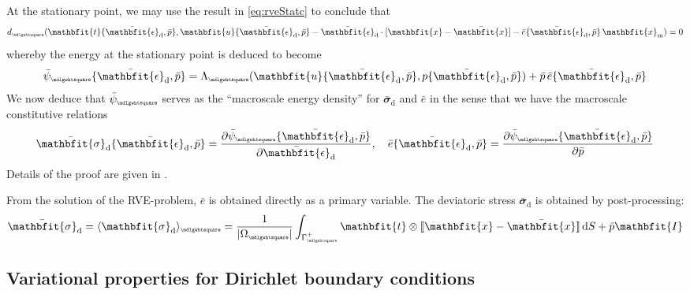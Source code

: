 \documentclass[12pt,a4paper]{article}
\renewcommand{\ta}[1]{\mathbfit{#1}}
\renewcommand{\ts}[1]{\mathbfit{#1}}
\renewcommand{\Box}{\mdlgwhtsquare}
\DeclarePairedDelimiter{\homgen}{\langle}{\rangle_\rve}
\DeclarePairedDelimiter{\jmp}{[\![}{]\!]}
\renewcommand{\dev}{\mathrm{d}}
\newcommand{\volume}{|\Omega_\rve|}
\newcommand{\epspargs}{\{{\bar{\ts\epsilon}}_\dev, \bar{p}\}}
\newcommand{\rve}{
  {\mathchoice
   {\mbox{\scalebox{0.67}{$\Box$}}}
   {\mbox{\scalebox{0.67}{$\Box$}}}
   {\mbox{\scalebox{0.5}{$\Box$}}}
   {\mbox{\scalebox{0.375}{$\Box$}}}
  }
}
\begin{document}
At the stationary point, we may use the result in \cref{eq:rveStatc} to conclude that
\begin{equation}
    d_\rve(\ta{t}\epspargs,\ta{u}\epspargs-\bar{\ts\epsilon}_\dev\cdot[\ta{x}-\bar{\ta{x}}]-\bar{e}\epspargs\,\ta{x}_\mean) = 0
\label{eq86}
\end{equation}
whereby the energy at the stationary point is deduced to become
\begin{equation}
    \bar{\psi}_\rve\epspargs =
    \Lambda_\rve(\ta{u}\epspargs,p\epspargs) + \bar{p}\,\bar{e}\epspargs
\label{eq87}
\end{equation}
We now deduce that $\bar{\psi}_\rve$ serves as the ``macroscale energy density'' for $\bar{\ts\sigma}_\dev$ and $\bar{e}$ in the sense that we have the macroscale constitutive relations
\begin{equation}
    \bar{\ts\sigma}_\dev\epspargs = \frac{\partial \bar{\psi}_\rve\epspargs}{\partial \bar{\ts\epsilon}_\dev}, \quad
     \bar{e}\epspargs = \frac{\partial \bar{\psi}_\rve\epspargs}{\partial \bar{p}}
\label{eq88}
\end{equation}
Details of the proof are given in .

From the solution of the RVE-problem, $\bar{e}$ is obtained directly as a primary variable.
The deviatoric stress $\bar{\ts\sigma}_\dev$ is obtained by post-processing:
\begin{align}
 \bar{\ts\sigma}_\dev = \homgen{\ts\sigma_\dev} = \frac{1}{\volume} \int_{\Gamma_\rve^+} \ta t \outerp \jmp{\ta x - \bar{\ta x}}\dif S + \bar{p}\ts I
\label{eq:weak_periodic_sigma_dev}
\end{align}


\subsection{Variational properties for Dirichlet boundary conditions}
\end{document}

